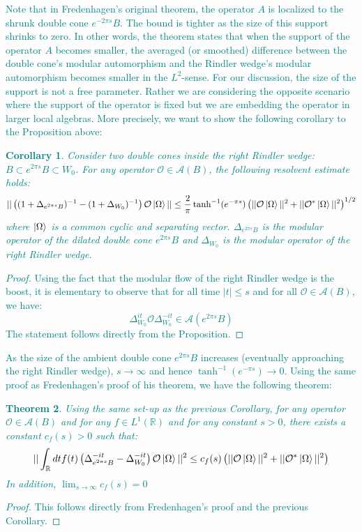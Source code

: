 \documentclass[a4paper,11pt]{article}
\newtheorem{theorem}{Theorem}
\newtheorem{corollary}[theorem]{Corollary}
\theoremstyle{definition}
\newcommand{\lb}{\left(}
\newcommand{\rb}{\right)}
\newcommand{\YC}[1]{\textcolor{teal}{#1}}
\begin{document}
\YC{
Note that in Fredenhagen's original theorem, the operator $A$ is localized to the shrunk double cone $e^{-2\pi s}B$. The bound is tighter as the size of this support shrinks to zero. In other words, the theorem states that when the support of the operator $A$ becomes smaller, the averaged (or smoothed) difference between the double cone's modular automorphism and the Rindler wedge's modular automorphism becomes smaller in the $L^2$-sense. For our discussion, the size of the support is not a free parameter. Rather we are considering the opposite scenario where the support of the operator is fixed but we are embedding the operator in larger local algebras. More precisely, we want to show the following corollary to the Proposition above:
\begin{corollary}
    Consider two double cones inside the right Rindler wedge: $B\subset e^{2\pi s}B\subset W_0$. For any operator $\mathcal{O}\in\mathcal{A}(B)$, the following resolvent estimate holds:
    \begin{equation}
        ||\lb(1 + \Delta_{e^{2\pi s}B})^{-1} - (1 + \Delta_{W_0})^{-1}\rb\mathcal{O}\ket{\Omega}||\leq \frac{2}{\pi}\tanh^{-1}(e^{-\pi s})\lb||\mathcal{O}\ket{\Omega}||^2 + ||\mathcal{O}^*\ket{\Omega}||^2\rb^{1/2}
    \end{equation}
    where $\ket{\Omega}$ is a common cyclic and separating vector. $\Delta_{e^{2\pi s}B}$ is the modular operator of the dilated double cone $e^{2\pi s}B$ and $\Delta_{W_0}$ is the modular operator of the right Rindler wedge.
\end{corollary}
\begin{proof}
    Using the fact that the modular flow of the right Rindler wedge is the boost, it is elementary to observe that for all time $|t|\leq s$ and for all $\mathcal{O}\in\mathcal{A}(B)$, we have:
    \begin{equation}
        \Delta_{W_0}^{it}\mathcal{O}\Delta^{-it}_{W_0} \in \mathcal{A}(e^{2\pi s}B)
    \end{equation}
    The statement follows directly from the Proposition.
\end{proof}
}
\YC{
As the size of the ambient double cone $e^{2\pi s}B$ increases (eventually approaching the right Rindler wedge), $s\rightarrow\infty$ and hence $\tanh^{-1}(e^{-\pi s})\rightarrow 0$. Using the same proof as Fredenhagen's proof of his theorem, we have the following theorem:
\begin{theorem}\label{theorem:modifiedfredenhagen}
    Using the same set-up as the previous Corollary, for any operator $\mathcal{O}\in \mathcal{A}(B)$ and for any $f\in L^1(\mathbb{R})$ and for any constant $s > 0$, there exists a constant $c_f(s) > 0$ such that:
    \begin{equation}
        ||\int_\mathbb{R} dt f(t)\lb\Delta^{-it}_{e^{2\pi s}B} - \Delta^{-it}_{W_0}\rb\mathcal{O}\ket{\Omega}||^2 \leq c_f(s)\lb||\mathcal{O}\ket{\Omega}||^2 + ||\mathcal{O}^*\ket{\Omega}||^2\rb
    \end{equation}
    In addition, $\lim_{s\rightarrow \infty}c_f(s) = 0$
\end{theorem}
\begin{proof}
    This follows directly from Fredenhagen's proof and the previous Corollary.
\end{proof}
}
\end{document}
